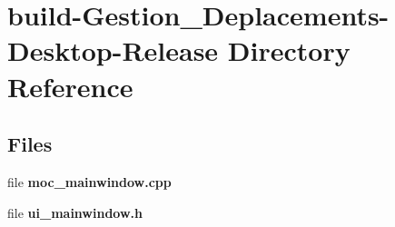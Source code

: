 \section{build-\/\-Gestion\-\_\-\-Deplacements-\/\-Desktop-\/\-Release Directory Reference}
\label{dir_1cd00ea52d481123e94959e377bed514}
\subsection*{Files}
\begin{DoxyCompactItemize}
\item 
file {\bfseries moc\-\_\-mainwindow.\-cpp}
\item 
file {\bfseries ui\-\_\-mainwindow.\-h}
\end{DoxyCompactItemize}
